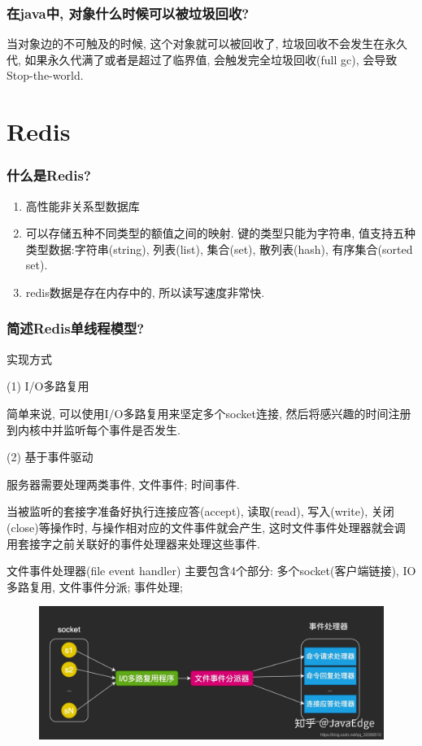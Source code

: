 \documentclass[UTF8]{ctexart}
\begin{document}
\subsubsection{在java中, 对象什么时候可以被垃圾回收?}
当对象边的不可触及的时候, 这个对象就可以被回收了, 垃圾回收不会发生在永久代, 如果永久代满了或者是超过了临界值, 会触发完全垃圾回收(full gc), 会导致Stop-the-world. 
\section{Redis}
\subsubsection{什么是Redis?}
\begin{enumerate}
	\item 高性能非关系型数据库
	\item 可以存储五种不同类型的额值之间的映射. 键的类型只能为字符串, 值支持五种类型数据:字符串(string), 列表(list), 集合(set), 散列表(hash), 有序集合(sorted set).
	\item redis数据是存在内存中的, 所以读写速度非常快.
\end{enumerate}
\subsubsection{简述Redis单线程模型?}
实现方式
\par
(1) I/O多路复用
\par
简单来说, 可以使用I/O多路复用来坚定多个socket连接, 然后将感兴趣的时间注册到内核中并监听每个事件是否发生. 
\par
(2) 基于事件驱动
\par
服务器需要处理两类事件, 文件事件; 时间事件.
\par
当被监听的套接字准备好执行连接应答(accept), 读取(read), 写入(write), 关闭(close)等操作时, 与操作相对应的文件事件就会产生, 这时文件事件处理器就会调用套接字之前关联好的事件处理器来处理这些事件.
\par
文件事件处理器(file event handler) 主要包含4个部分: 多个socket(客户端链接), IO多路复用, 文件事件分派; 事件处理;
\begin{figure}
	\centering
	\includegraphics[width=0.7\linewidth]{figures/redis_file_event.jpg}
	\caption{}
	\label{fig:redis_file_event}
\end{figure}
\end{document}
